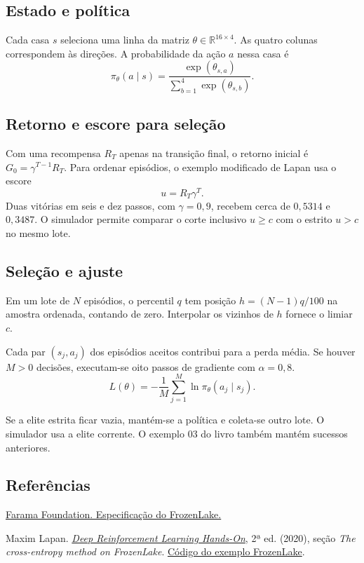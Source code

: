 \subsection*{Estado e política}
Cada casa $s$ seleciona uma linha da matriz $\theta\in\mathbb{R}^{16\times4}$. As quatro colunas correspondem às direções. A probabilidade da ação $a$ nessa casa é
\[
 \pi_\theta(a\mid s)=\frac{\exp(\theta_{s,a})}{\sum_{b=1}^{4}\exp(\theta_{s,b})}.
\]

\subsection*{Retorno e escore para seleção}
Com uma recompensa $R_T$ apenas na transição final, o retorno inicial é $G_0=\gamma^{T-1}R_T$. Para ordenar episódios, o exemplo modificado de Lapan usa o escore
\[
 u=R_T\gamma^T.
\]
Duas vitórias em seis e dez passos, com $\gamma=0{,}9$, recebem cerca de $0{,}5314$ e $0{,}3487$. O simulador permite comparar o corte inclusivo $u\ge c$ com o estrito $u>c$ no mesmo lote.

\subsection*{Seleção e ajuste}
Em um lote de $N$ episódios, o percentil $q$ tem posição $h=(N-1)q/100$ na amostra ordenada, contando de zero. Interpolar os vizinhos de $h$ fornece o limiar $c$.

Cada par $(s_j,a_j)$ dos episódios aceitos contribui para a perda média. Se houver $M>0$ decisões, executam-se oito passos de gradiente com $\alpha=0{,}8$.
\[
 L(\theta)=-\frac{1}{M}\sum_{j=1}^{M}\ln\pi_\theta(a_j\mid s_j).
\]

Se a elite estrita ficar vazia, mantém-se a política e coleta-se outro lote. O simulador usa a elite corrente. O exemplo 03 do livro também mantém sucessos anteriores.


\subsection*{Referências}
\noindent \href{https://gymnasium.farama.org/environments/toy_text/frozen_lake/}{Farama Foundation. Especificação do FrozenLake.}

\noindent Maxim Lapan. \href{https://www.packtpub.com/en-us/product/deep-reinforcement-learning-hands-on-9781838826994}{\emph{Deep Reinforcement Learning Hands-On}}, 2ª ed. (2020), seção \emph{The cross-entropy method on FrozenLake}. \href{https://github.com/PacktPublishing/Deep-Reinforcement-Learning-Hands-On-Second-Edition/blob/master/Chapter04/03_frozenlake_tweaked.py}{Código do exemplo FrozenLake}.

